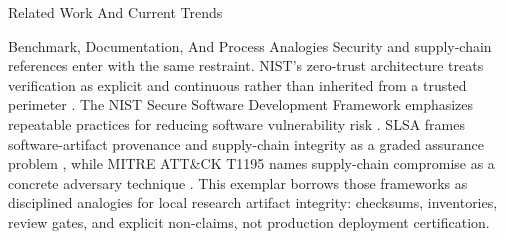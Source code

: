 \documentclass[
  ignorenonframetext,
]{beamer}
\begin{document}
\begin{frame}{Related Work And Current Trends}
\begin{block}{Benchmark, Documentation, And Process Analogies}
Security and supply-chain references enter with the same restraint.
NIST's zero-trust architecture treats verification as explicit and
continuous rather than inherited from a trusted perimeter
. The NIST Secure Software
Development Framework emphasizes repeatable practices for reducing
software vulnerability risk . SLSA frames
software-artifact provenance and supply-chain integrity as a graded
assurance problem , while MITRE ATT\&CK T1195
names supply-chain compromise as a concrete adversary technique
. This exemplar borrows those frameworks as
disciplined analogies for local research artifact integrity: checksums,
inventories, review gates, and explicit non-claims, not production
deployment certification.
\end{block}
\end{frame}
\end{document}
